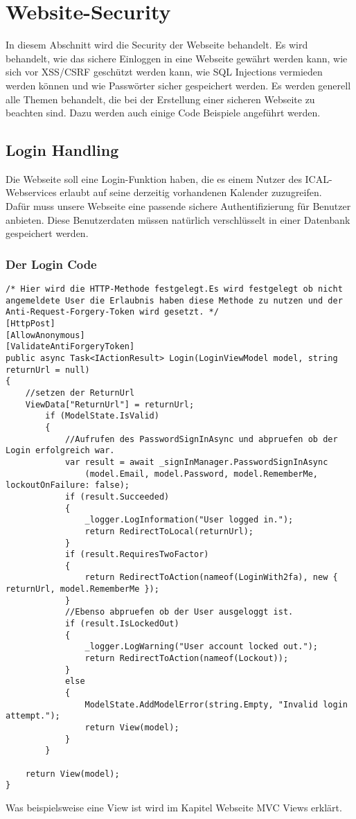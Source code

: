\chapter{Website-Security}
\label{sec:Security}
\renewcommand{\theauthor}{Marcel Stering}
In diesem Abschnitt wird die Security der Webseite behandelt.
Es wird behandelt, wie das sichere Einloggen in eine Webseite gewährt werden kann, wie sich vor XSS/CSRF geschützt werden kann, wie SQL Injections vermieden werden können und wie Passwörter sicher gespeichert werden. Es werden generell alle Themen behandelt, die bei der Erstellung einer sicheren Webseite zu beachten sind. Dazu werden auch einige Code Beispiele angeführt werden.
\section{Login Handling}
\label{sec:Login}
Die Webseite soll eine Login-Funktion haben, die es einem Nutzer des ICAL-Webservices erlaubt auf seine derzeitig vorhandenen Kalender zuzugreifen.\\Dafür muss unsere Webseite eine passende sichere Authentifizierung für Benutzer anbieten. Diese Benutzerdaten müssen natürlich verschlüsselt in einer Datenbank gespeichert werden. 
\subsection{Der Login Code}
\label{sec:Login_Handling_Code}
\begin{lstlisting}[caption={Login}]
/* Hier wird die HTTP-Methode festgelegt.Es wird festgelegt ob nicht angemeldete User die Erlaubnis haben diese Methode zu nutzen und der Anti-Request-Forgery-Token wird gesetzt. */
[HttpPost]
[AllowAnonymous]
[ValidateAntiForgeryToken]
public async Task<IActionResult> Login(LoginViewModel model, string returnUrl = null)
{
	//setzen der ReturnUrl
    ViewData["ReturnUrl"] = returnUrl;
        if (ModelState.IsValid)
        {
        	//Aufrufen des PasswordSignInAsync und abpruefen ob der Login erfolgreich war.
            var result = await _signInManager.PasswordSignInAsync
            	(model.Email, model.Password, model.RememberMe, lockoutOnFailure: false);
            if (result.Succeeded)
            {
                _logger.LogInformation("User logged in.");
                return RedirectToLocal(returnUrl);
            }
            if (result.RequiresTwoFactor)
            {
                return RedirectToAction(nameof(LoginWith2fa), new { returnUrl, model.RememberMe });
            }
            //Ebenso abpruefen ob der User ausgeloggt ist.
            if (result.IsLockedOut)
            {
                _logger.LogWarning("User account locked out.");
                return RedirectToAction(nameof(Lockout));
            }
            else
            {
                ModelState.AddModelError(string.Empty, "Invalid login attempt.");
                return View(model);
            }
        }

    return View(model);
}
\end{lstlisting}
Was beispielsweise eine View ist wird im Kapitel Webseite MVC Views erklärt. 
